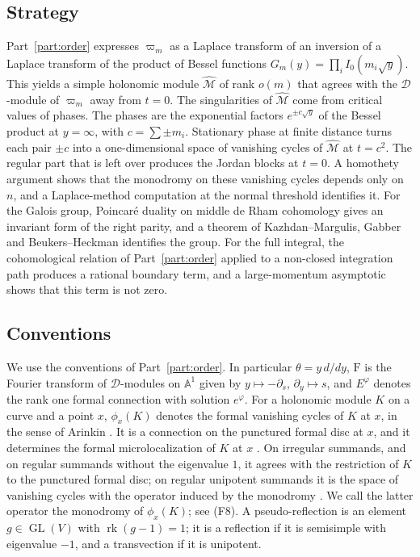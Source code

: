 \documentclass[11pt,a4paper]{article}
\theoremstyle{definition}
\theoremstyle{remark}
\numberwithin{equation}{section}
\newcommand{\A}{\mathbb{A}}
\newcommand{\cD}{\mathcal{D}}
\newcommand{\cM}{\mathcal{M}}
\newcommand{\Four}{\mathrm{F}}
\DeclareMathOperator{\rk}{rk}
\newcommand{\Mhat}{\widehat{\cM}}
\DeclareMathOperator{\GL}{GL}
\begin{document}
\subsection{Strategy}
Part~\ref{part:order} expresses $\varpi_m$ as a Laplace transform of an inversion of a Laplace transform of the product of Bessel functions $G_m(y)=\prod_iI_0(m_i\sqrt y)$. This yields a simple holonomic module $\Mhat$ of rank $o(m)$ that agrees with the $\cD$-module of $\varpi_m$ away from $t=0$. The singularities of $\Mhat$ come from critical values of phases. The phases are the exponential factors $e^{\pm c\sqrt y}$ of the Bessel product at $y=\infty$, with $c=\sum\pm m_i$. Stationary phase at finite distance \cite{Ari08,GL04,BE04} turns each pair $\pm c$ into a one-dimensional space of vanishing cycles of $\Mhat$ at $t=c^2$. The regular part that is left over produces the Jordan blocks at $t=0$. A homothety argument shows that the monodromy on these vanishing cycles depends only on $n$, and a Laplace-method computation at the normal threshold identifies it. For the Galois group, Poincaré duality on middle de Rham cohomology gives an invariant form of the right parity, and a theorem of Kazhdan--Margulis, Gabber and Beukers--Heckman \cite[Thm.~1.5]{Kat90} identifies the group. For the full integral, the cohomological relation of Part~\ref{part:order} applied to a non-closed integration path produces a rational boundary term, and a large-momentum asymptotic shows that this term is not zero.

\subsection*{Conventions}
We use the conventions of Part~\ref{part:order}. In particular $\theta=y\,d/dy$, $\Four$ is the Fourier transform of $\cD$-modules on $\A^1$ given by $y\mapsto-\partial_s$, $\partial_y\mapsto s$, and $E^{\varphi}$ denotes the rank one formal connection with solution $e^{\varphi}$. For a holonomic module $K$ on a curve and a point $x$, $\phi_x(K)$ denotes the formal vanishing cycles of $K$ at $x$, in the sense of Arinkin \cite[\S3.1, Cor.~4.2]{Ari08}. It is a connection on the punctured formal disc at $x$, and it determines the formal microlocalization of $K$ at $x$ \cite[Prop.~3.3]{Ari08}. On irregular summands, and on regular summands without the eigenvalue $1$, it agrees with the restriction of $K$ to the punctured formal disc; on regular unipotent summands it is the space of vanishing cycles with the operator induced by the monodromy \cite[\S3.3]{Ari08}. We call the latter operator the monodromy of $\phi_x(K)$; see (F8). A pseudo-reflection is an element $g\in\GL(V)$ with $\rk(g-1)=1$; it is a reflection if it is semisimple with eigenvalue $-1$, and a transvection if it is unipotent.
\end{document}
